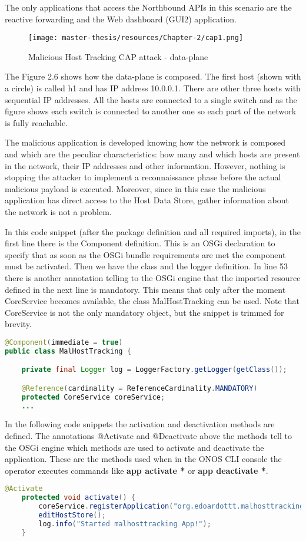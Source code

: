 \documentclass[a4paper,10pt]{memoir}
\begin{document}
The only applications that access the Northbound APIs in this scenario are the reactive forwarding and the Web dashboard (GUI2) application.

\begin{figure}[h]
\caption{Malicious Host Tracking CAP attack - data-plane}
\label{fig:cap1-dataplane}
\texttt{[image: master-thesis/resources/Chapter-2/cap1.png]}
\centering
\end{figure}

The Figure 2.6 shows how the data-plane is composed. The first host (shown with a circle) is called h1 and has IP address 10.0.0.1. There are other three hosts with sequential IP addresses. All the hosts are connected to a single switch and as the figure shows each switch is connected to another one so each part of the network is fully reachable. 
\medskip

The malicious application is developed knowing how the network is composed and which are the peculiar characteristics: how many and which hosts are present in the network, their IP addresses and other information. However, nothing is stopping the attacker to implement a reconnaissance phase before the actual malicious payload is executed. Moreover, since in this case the malicious application has direct access to the Host Data Store, gather information about the network is not a problem. 

In this code snippet (after the package definition and all required imports), in the first line there is the Component definition. This is an OSGi declaration to specify that as soon as the OSGi bundle requirements are met the component must be activated. Then we have the class and the logger definition. In line 53 there is another annotation telling to the OSGi engine that the imported resource defined in the next line is mandatory. This means that only after the moment  CoreService becomes available, the class MalHostTracking can be used. Note that CoreService is not the only mandatory object, but the snippet is trimmed for brevity.
\begin{lstlisting}[language=java,firstnumber=48]
@Component(immediate = true)
public class MalHostTracking {

    private final Logger log = LoggerFactory.getLogger(getClass());

    @Reference(cardinality = ReferenceCardinality.MANDATORY)
    protected CoreService coreService;
    ...
\end{lstlisting}

In the following code snippets the activation and deactivation methods are defined. The annotations @Activate and @Deactivate above the methods tell to the OSGi engine which methods are used to activate and deactivate the application. These are the methods used when in the ONOS CLI console the operator executes commands like \textbf{app activate *} or \textbf{app deactivate *}.
\begin{lstlisting}[language=java,firstnumber=82]
    @Activate
    protected void activate() {
        coreService.registerApplication("org.edoardottt.malhosttracking.app")
        editHostStore();
        log.info("Started malhosttracking App!");
    }
\end{lstlisting}
\end{document}
